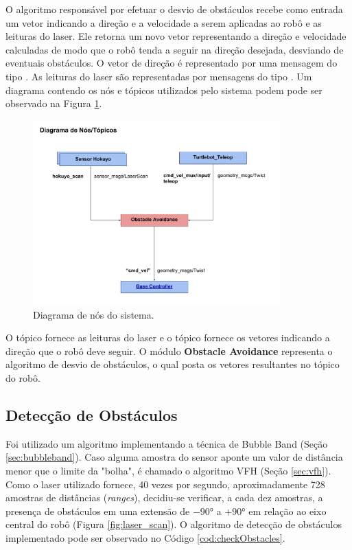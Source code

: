 O algoritmo responsável por efetuar o desvio de obstáculos recebe como
entrada um vetor indicando a direção e a velocidade a serem aplicadas
ao robô e as leituras do laser. Ele retorna um novo vetor
representando a direção e velocidade calculadas de modo que o robô
tenda a seguir na direção desejada, desviando de eventuais obstáculos.
O vetor de direção é representado por uma mensagem do tipo
. As leituras do laser são representadas
por mensagens do tipo . Um diagrama
contendo os nós e tópicos utilizados pelo sistema podem pode ser
observado na Figura \ref{fig:diag_proj_ros}.

\begin{figure}[H]
    \centering
    \includegraphics[width=0.85\textwidth]{img/Diagrama_Projeto_ROS.pdf}
    \caption{Diagrama de nós do sistema.}
    \label{fig:diag_proj_ros}
\end{figure}

O tópico  fornece as leituras do laser e o tópico
 fornece os vetores indicando a direção que
o robô deve seguir. O módulo \textbf{Obstacle Avoidance} representa o
algoritmo de desvio de obstáculos, o qual posta os vetores resultantes
no tópico  do robô.

\subsection{Detecção de Obstáculos}

Foi utilizado um algoritmo implementando a técnica de Bubble Band  (Seção \ref{sec:bubbleband}). Caso alguma amostra do sensor aponte um valor
de distância menor que o limite da "bolha", é chamado o algoritmo VFH (Seção \ref{sec:vfh}). Como o
laser utilizado fornece, 40 vezes por segundo, aproximadamente 728 amostras de distâncias
(\textit{ranges}), decidiu-se verificar, a cada
dez amostras, a presença de obstáculos em uma extensão de $-90°$ a $+90°$ em relação
ao eixo central do robô (Figura \ref{fig:laser_scan}). O algoritmo de
detecção de obstáculos implementado pode ser observado no Código
\ref{cod:checkObstacles}.

